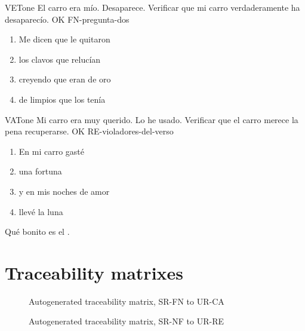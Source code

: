 \documentclass[a4paper,10pt]{article}
\begin{document}
  \printtesttemplate

  \begin{testCase}{VET}{one}
    {El carro era mío.}  %
    {Desaparece.}  %
    {Verificar que mi carro verdaderamente ha desaparecío.}  %
    {OK}  %
    {FN-pregunta-dos}  %
    \begin{enumerate}[leftmargin=*, topsep=0pt, noitemsep]
      \item Me dicen que le quitaron
      \item los clavos que relucían
      \item creyendo que eran de oro
      \item de limpios que los tenía
    \end{enumerate}
  \end{testCase}

  \begin{testCase}{VAT}{one}
    {Mi carro era muy querido.}  %
    {Lo he usado.}  %
    {Verificar que el carro merece la pena recuperarse.}  %
    {OK}  %
    {RE-violadores-del-verso}  %
    \begin{enumerate}[leftmargin=*, topsep=0pt, noitemsep]
      \item En mi carro gasté
      \item una fortuna
      \item y en mis noches de amor
      \item llevé la luna
    \end{enumerate}
  \end{testCase}

  \FloatBarrier

  Qué bonito es el .



  \section{Traceability matrixes}

  \begin{figure}[htbp]
    \centering\traceabilityFNCA
    \caption{Autogenerated traceability matrix, SR-FN to UR-CA}
  \end{figure}

  \begin{figure}[htbp]
    \centering\traceabilityNFRE
    \caption{Autogenerated traceability matrix, SR-NF to UR-RE}
  \end{figure}
\end{document}
